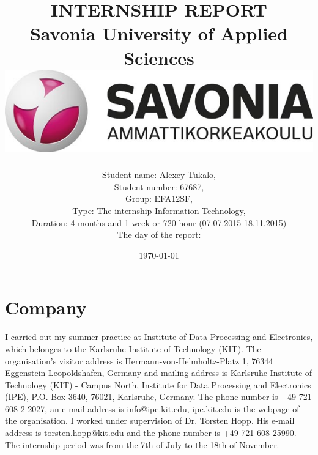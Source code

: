 \documentclass[english]{article}
\date{}
\begin{document}
\title{\vspace{2.5in}INTERNSHIP REPORT\\
\small Savonia University of Applied Sciences\\
\vspace{0.3in}\includegraphics{savonia.jpg}}

\nopagebreak
\maketitle


\vspace{2.7in}

\author{
\begin{flushleft}
Student name: Alexey Tukalo,\\
Student number: 67687,\\
Group: EFA12SF,\\
Type: The internship Information Technology,\\
Duration: 4 months and 1 week or 720 hour (07.07.2015-18.11.2015)\\
The day of the report: \date{\today}
\end{flushleft}
}

\thispagestyle{empty}

\newpage
\setcounter{page}{1}
\setcounter{tocdepth}{2}
\tableofcontents

\newpage


\section{Company}

I carried out my summer practice at Institute of Data Processing and Electronics, which belonges to the Karlsruhe Institute of Technology (KIT). The organisation's visitor address is Hermann-von-Helmholtz-Platz 1, 76344 Eggenstein-Leopoldshafen, Germany and mailing address is Karlsruhe Institute of Technology (KIT) - Campus North, Institute for Data Processing and Electronics (IPE), P.O. Box 3640, 76021, Karlsruhe, Germany. The phone number is +49 721 608 2 2027, an e-mail address is info@ipe.kit.edu, ipe.kit.edu is the webpage of the organisation. I worked under supervision of Dr. Torsten Hopp. His e-mail address is torsten.hopp@kit.edu and the phone number is +49 721 608-25990. The internship period was from the 7th of July to the 18th of November.
\end{document}
